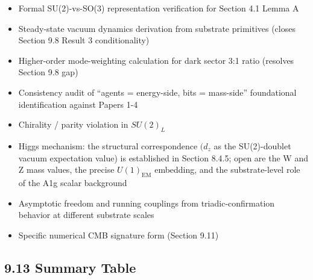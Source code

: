 \documentclass[11pt,oneside]{report}
\theoremstyle{definition}
\theoremstyle{remark}
\providecommand{\tightlist}{\setlength{\itemsep}{0pt}\setlength{\parskip}{0pt}}
\begin{document}
\begin{itemize}
\tightlist
\item
  Formal SU(2)-vs-SO(3) representation verification for Section 4.1
  Lemma A
\end{itemize}

\begin{itemize}
\tightlist
\item
  Steady-state vacuum dynamics derivation from substrate primitives
  (closes Section 9.8 Result 3 conditionality)
\end{itemize}

\begin{itemize}
\tightlist
\item
  Higher-order mode-weighting calculation for dark sector 3:1 ratio
  (resolves Section 9.8 gap)
\end{itemize}

\begin{itemize}
\tightlist
\item
  Consistency audit of ``agents = energy-side, bits = mass-side''
  foundational identification against Papers 1-4
\end{itemize}

\begin{itemize}
\tightlist
\item
  Chirality / parity violation in \ensuremath{SU(2)_{L}}
\end{itemize}

\begin{itemize}
\tightlist
\item
  Higgs mechanism: the structural correspondence \ensuremath{(d_{z}} as the
  SU(2)-doublet vacuum expectation value) is established in Section
  8.4.5; open are the W and Z mass values, the precise \ensuremath{U(1)_{\mathrm{EM}}}
  embedding, and the substrate-level role of the A1g scalar background
\end{itemize}

\begin{itemize}
\tightlist
\item
  Asymptotic freedom and running couplings from triadic-confirmation
  behavior at different substrate scales
\end{itemize}

\begin{itemize}
\tightlist
\item
  Specific numerical CMB signature form (Section 9.11)
\end{itemize}

\subsection*{9.13 Summary Table}
\end{document}
